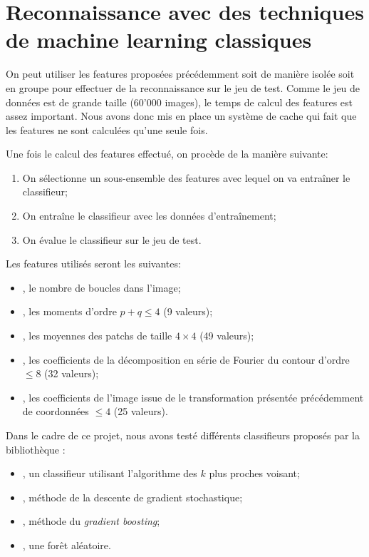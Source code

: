 \section{Reconnaissance avec des techniques de machine learning classiques}

On peut utiliser les features proposées précédemment soit de manière isolée 
soit en groupe pour effectuer de la reconnaissance sur le jeu de test.
Comme le jeu de données est de grande taille (60'000 images), le temps de 
calcul des features est assez important. 
Nous avons donc mis en place un système de cache qui fait que les features ne 
sont calculées qu'une seule fois.

Une fois le calcul des features effectué, on procède de la manière suivante:
\begin{enumerate}
  \item On sélectionne un sous-ensemble des features avec lequel on va entraîner le classifieur;
  \item On entraîne le classifieur avec les données d'entraînement;
  \item On évalue le classifieur sur le jeu de test.
\end{enumerate}

Les features utilisés seront les suivantes:
\begin{itemize}
  \item {}, le nombre de boucles dans l'image;
  \item {}, les moments d'ordre $p+q \leq 4$ (9 valeurs);
  \item {}, les moyennes des patchs de taille $4 \times 4$ (49 valeurs);
  \item {}, les coefficients de la décomposition en série de Fourier du contour d'ordre $\leq 8$ (32 valeurs);
  \item {}, les coefficients de l'image issue de le transformation  présentée précédemment de coordonnées $\leq 4$ (25 valeurs).
\end{itemize}


Dans le cadre de ce projet, nous avons testé différents classifieurs proposés 
par la bibliothèque :
\begin{itemize}
  \item {}, un classifieur utilisant l'algorithme des $k$ plus proches voisant;
  \item {}, méthode de la descente de gradient stochastique;
  \item {}, méthode du \emph{gradient boosting};
  \item {}, une forêt aléatoire.
\end{itemize}

